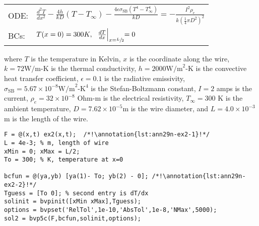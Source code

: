 \begin{table}
\begin{tabular}{l l}
ODE: & $\frac{d^2T}{dx^2}-\frac{4h}{kD}\left(T-T_{\infty}\right)-\frac{4\epsilon \sigma_{\text{SB}} \left(T^4 - T_{\infty}^4 \right)}{kD}=-\frac{I^2\rho_e}{k \left(\frac{1}{4}\pi D^{2}\right)^2} $\\
BCs: & $T(x=0)=300K, \ \ \frac{dT}{dx}\Bigl|_{x=\sfrac{L}{2}}=0$ \\
\end{tabular}
\end{table}
\noindent where $T$ is the temperature in Kelvin, $x$ is the coordinate along the wire, $k = 72 \text{W/m-K}$ is the thermal conductivity, $h=2000 \text{W/m}^2\text{-K}$ is the convective heat transfer coefficient, $\epsilon=0.1$ is the radiative emissivity, $\sigma_{\text{SB}}=5.67\times 10^{-8} \text{W/m}^2\text{-K}^4$ is the Stefan-Boltzmann constant, $I=2$ amps is the current, $\rho_e=32\times 10^{-8}$ Ohm-m is the electrical resistivity, $T_{\infty}=300$ K is the ambient temperature, $D=7.62\times 10^{-5}$m is the wire diameter, and $L=4.0\times 10^{-3}$m is the length of the wire.
\setcounter{lstannotation}{0} %
\begin{lstlisting}[style=myMatlab,name=lec29n-ex2]
F = @(x,t) ex2(x,t);  /*!\annotation{lst:ann29n-ex2-1}!*/
L = 4e-3; % m, length of wire
xMin = 0; xMax = L/2;
To = 300; % K, temperature at x=0

bcfun = @(ya,yb) [ya(1)- To; yb(2) - 0]; /*!\annotation{lst:ann29n-ex2-2}!*/
Tguess = [To 0]; % second entry is dT/dx
solinit = bvpinit([xMin xMax],Tguess);
options = bvpset('RelTol',1e-10,'AbsTol',1e-8,'NMax',5000);
sol2 = bvp5c(F,bcfun,solinit,options);
\end{lstlisting}

